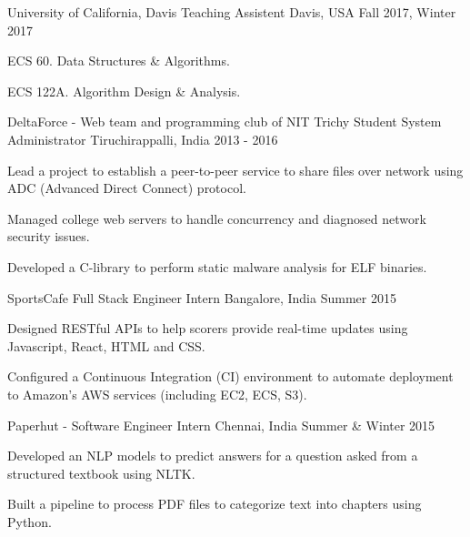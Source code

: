 \begin{cventries}
  \cventry
    {University of California, Davis} %
    {Teaching Assistent} %
    {Davis, USA} %
    {Fall 2017, Winter 2017} %
    {
      \begin{cvitems} %
        \item {ECS 60. Data Structures \& Algorithms.}
        \item {ECS 122A. Algorithm Design \& Analysis.}
      \end{cvitems}
    }



  \cventry
    {DeltaForce - Web team and programming club of NIT Trichy} %
    {Student System Administrator} %
    {Tiruchirappalli, India} %
    {2013 - 2016} %
    {
      \begin{cvitems} %
        \item {Lead a project to establish a peer-to-peer service to share files over network using ADC (Advanced Direct Connect) protocol.}    
        \item {Managed college web servers to handle concurrency and diagnosed network security issues.}
        \item {Developed a C-library to perform static malware analysis for ELF binaries.}
      \end{cvitems}
    }



  \cventry
    {SportsCafe} %
    {Full Stack Engineer Intern} %
    {Bangalore, India} %
    {Summer 2015} %
    {
      \begin{cvitems} %
        \item{Designed RESTful APIs to help scorers provide real-time updates using Javascript, React, HTML and CSS.}
        \item{Configured a Continuous Integration (CI) environment to automate deployment to Amazon's AWS services (including EC2, ECS, S3).}
      \end{cvitems}
    }

  \cventry
    {Paperhut - } %
    {Software Engineer Intern} %
    {Chennai, India} %
    {Summer \& Winter 2015} %
    {
      \begin{cvitems}
        \item{Developed an NLP models to predict answers for a question asked from a structured textbook using NLTK.}
        \item{Built a pipeline to process PDF files to categorize text into chapters using Python.}
      \end{cvitems}
    }

\end{cventries}
